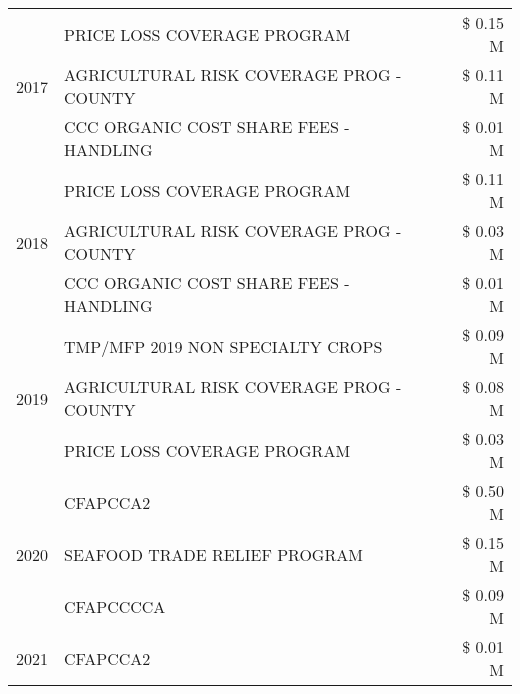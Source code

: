 \begin{tabular}{llr}
\cline{1-3}
\multirow[t]{3}{*}{2017} & PRICE LOSS COVERAGE PROGRAM & \$ 0.15 M \\
 & AGRICULTURAL RISK COVERAGE PROG - COUNTY & \$ 0.11 M \\
 & CCC ORGANIC COST SHARE FEES - HANDLING & \$ 0.01 M \\
\cline{1-3}
\multirow[t]{3}{*}{2018} & PRICE LOSS COVERAGE PROGRAM & \$ 0.11 M \\
 & AGRICULTURAL RISK COVERAGE PROG - COUNTY & \$ 0.03 M \\
 & CCC ORGANIC COST SHARE FEES - HANDLING & \$ 0.01 M \\
\cline{1-3}
\multirow[t]{3}{*}{2019} & TMP/MFP 2019 NON SPECIALTY CROPS & \$ 0.09 M \\
 & AGRICULTURAL RISK COVERAGE PROG - COUNTY & \$ 0.08 M \\
 & PRICE LOSS COVERAGE PROGRAM & \$ 0.03 M \\
\cline{1-3}
\multirow[t]{3}{*}{2020} & CFAPCCA2 & \$ 0.50 M \\
 & SEAFOOD TRADE RELIEF PROGRAM & \$ 0.15 M \\
 & CFAPCCCCA & \$ 0.09 M \\
\cline{1-3}
2021 & CFAPCCA2 & \$ 0.01 M \\
\cline{1-3}
\bottomrule
\end{tabular}
